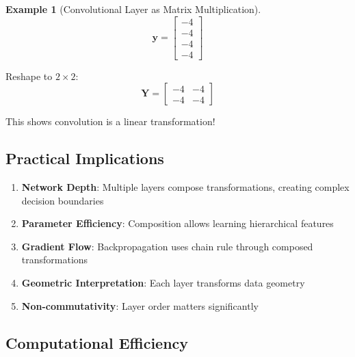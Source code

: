 \documentclass[12pt,a4paper]{article}
\theoremstyle{definition}
\newtheorem{example}{Example}[section]
\begin{document}
\begin{example}[Convolutional Layer as Matrix Multiplication]
\[
\mathbf{y} = \begin{bmatrix}
-4 \\ -4 \\ -4 \\ -4
\end{bmatrix}
\]

Reshape to $2 \times 2$:
\[
\mathbf{Y} = \begin{bmatrix}
-4 & -4 \\
-4 & -4
\end{bmatrix}
\]

This shows convolution is a linear transformation!
\end{example}

\subsection{Practical Implications}

\begin{tcolorbox}[enhanced,breakable,colback=yellow!10!white,colframe=orange!75!black,title=Key Takeaways for ML/DL]
\begin{enumerate}
\item \textbf{Network Depth}: Multiple layers compose transformations, creating complex decision boundaries
\item \textbf{Parameter Efficiency}: Composition allows learning hierarchical features
\item \textbf{Gradient Flow}: Backpropagation uses chain rule through composed transformations
\item \textbf{Geometric Interpretation}: Each layer transforms data geometry
\item \textbf{Non-commutativity}: Layer order matters significantly
\end{enumerate}
\end{tcolorbox}

\subsection{Computational Efficiency}
\end{document}
